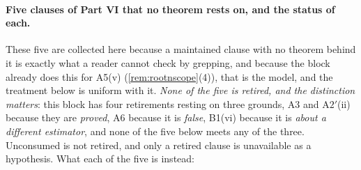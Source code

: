 
\paragraph{Five clauses of Part VI that no theorem rests on, and the status of each.}
These five are collected here because a maintained clause with no theorem behind it is exactly what a
reader cannot check by grepping, and because the block already does this for A5(v)
(\cref{rem:rootnscope}\textup{(4)}), that is the model, and the treatment below is uniform with
it. \emph{None of the five is retired, and the distinction matters}: this block has four retirements resting
on three grounds, A3 and A$2'$(ii) because they are \emph{proved}, A6 because it is
\emph{false}, B1(vi) because it is \emph{about a different estimator}, and none of the five below meets any
of the three. Unconsumed is not retired, and only a retired clause is unavailable as a hypothesis. What each
of the five is instead:
